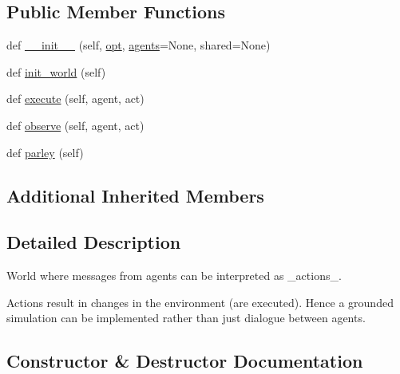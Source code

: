 \subsection*{Public Member Functions}
\begin{DoxyCompactItemize}
\item 
def \hyperlink{classparlai_1_1core_1_1worlds_1_1ExecutableWorld_a53d0974884562c0c2f92727dcc5a811b}{\+\_\+\+\_\+init\+\_\+\+\_\+} (self, \hyperlink{classparlai_1_1core_1_1worlds_1_1World_a3640d92718acd3e6942a28c1ab3678bd}{opt}, \hyperlink{classparlai_1_1core_1_1worlds_1_1MultiAgentDialogWorld_a05fc93525cb86edef121980fc55f9926}{agents}=None, shared=None)
\item 
def \hyperlink{classparlai_1_1core_1_1worlds_1_1ExecutableWorld_a8bb31ec1d93a94cb261f89ce0992159a}{init\+\_\+world} (self)
\item 
def \hyperlink{classparlai_1_1core_1_1worlds_1_1ExecutableWorld_a318fbf7c75178f62a6d46647f1a063fa}{execute} (self, agent, act)
\item 
def \hyperlink{classparlai_1_1core_1_1worlds_1_1ExecutableWorld_a69934ec2181a8b22269e02ab8b3bb1f2}{observe} (self, agent, act)
\item 
def \hyperlink{classparlai_1_1core_1_1worlds_1_1ExecutableWorld_a6555592d2b7c316e72febc1fccf43bdb}{parley} (self)
\end{DoxyCompactItemize}
\subsection*{Additional Inherited Members}


\subsection{Detailed Description}
\begin{DoxyVerb}World where messages from agents can be interpreted as _actions_.

Actions result in changes in the environment (are executed). Hence a grounded
simulation can be implemented rather than just dialogue between agents.
\end{DoxyVerb}
 

\subsection{Constructor \& Destructor Documentation}
\mbox{\label{classparlai_1_1core_1_1worlds_1_1ExecutableWorld_a53d0974884562c0c2f92727dcc5a811b}} 
